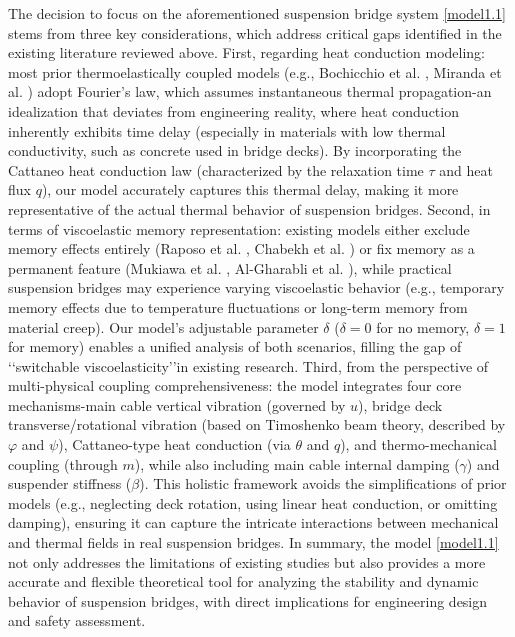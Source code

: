 \documentclass[11pt,reqno]{article}
\begin{document}
The decision to focus on the aforementioned suspension bridge system \eqref{model1.1} stems from three key considerations, which address critical gaps identified in the existing literature reviewed above. First, regarding heat conduction modeling: most prior thermoelastically coupled models (e.g., Bochicchio et al. \cite{MR4149715}, Miranda et al. \cite{MR4887867}) adopt Fourier's law, which assumes instantaneous thermal propagation-an idealization that deviates from engineering reality, where heat conduction inherently exhibits time delay (especially in materials with low thermal conductivity, such as concrete used in bridge decks). By incorporating the Cattaneo heat conduction law (characterized by the relaxation time $\tau$ and heat flux $q$), our model accurately captures this thermal delay, making it more representative of the actual thermal behavior of suspension bridges. Second, in terms of viscoelastic memory representation: existing models either exclude memory effects entirely (Raposo et al. \cite{MR4688212}, Chabekh et al. \cite{MR4848548}) or fix memory as a permanent feature (Mukiawa et al. \cite{MR4913141}, Al-Gharabli et al. \cite{MR4891851}), while practical suspension bridges may experience varying viscoelastic behavior (e.g., temporary memory effects due to temperature fluctuations or long-term memory from material creep). Our model's adjustable parameter $\delta$ ($\delta=0$ for no memory, $\delta=1$ for memory) enables a unified analysis of both scenarios, filling the gap of \lq\lq switchable viscoelasticity\rq\rq in existing research. Third, from the perspective of multi-physical coupling comprehensiveness: the model integrates four core mechanisms-main cable vertical vibration (governed by $u$), bridge deck transverse/rotational vibration (based on Timoshenko beam theory, described by $\varphi$ and $\psi$), Cattaneo-type heat conduction (via $\theta$ and $q$), and thermo-mechanical coupling (through $m$), while also including main cable internal damping ($\gamma$) and suspender stiffness ($\beta$). This holistic framework avoids the simplifications of prior models (e.g., neglecting deck rotation, using linear heat conduction, or omitting damping), ensuring it can capture the intricate interactions between mechanical and thermal fields in real suspension bridges. In summary, the model \eqref{model1.1} not only addresses the limitations of existing studies but also provides a more accurate and flexible theoretical tool for analyzing the stability and dynamic behavior of suspension bridges, with direct implications for engineering design and safety assessment.
\end{document}
